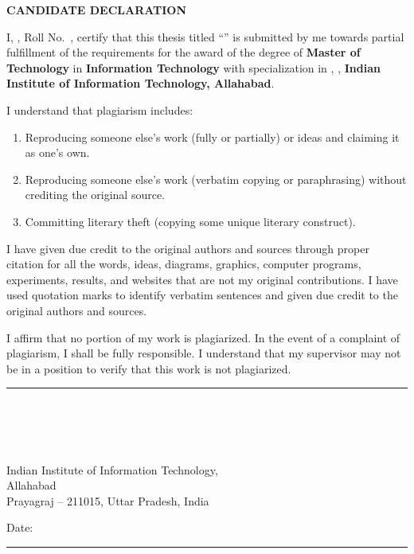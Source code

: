 \clearpage
\thispagestyle{empty}
\begin{singlespacing}
\noindent{}

\vspace{6mm}
\begin{center}
    {\large\bfseries CANDIDATE DECLARATION}
\end{center}
\vspace{4mm}

\noindent I, \textbf{\studentonename}, Roll No.\ \textbf{\studentoneroll}, certify that this thesis titled ``\textbf{\ttitle}'' is submitted by me towards partial fulfillment of the requirements for the award of the degree of \textbf{Master of Technology} in \textbf{Information Technology} with specialization in \textbf{\specializationname}, \textbf{\deptname}, \textbf{Indian Institute of Information Technology, Allahabad}.

\vspace{4mm}
\noindent I understand that plagiarism includes:
\begin{enumerate}
    \item Reproducing someone else's work (fully or partially) or ideas and claiming it as one's own.
    \item Reproducing someone else's work (verbatim copying or paraphrasing) without crediting the original source.
    \item Committing literary theft (copying some unique literary construct).
\end{enumerate}

\noindent I have given due credit to the original authors and sources through proper citation for all the words, ideas, diagrams, graphics, computer programs, experiments, results, and websites that are not my original contributions. I have used quotation marks to identify verbatim sentences and given due credit to the original authors and sources.

\vspace{4mm}
\noindent I affirm that no portion of my work is plagiarized. In the event of a complaint of plagiarism, I shall be fully responsible. I understand that my supervisor may not be in a position to verify that this work is not plagiarized.

\vspace{10mm}
\noindent\begin{minipage}[t]{0.50\textwidth}
    \rule{6cm}{0.4pt}\\[2mm]
    \textbf{\studentonename}\\
    \textbf{\studentoneroll}\\
    \deptname\\
    Indian Institute of Information Technology,\\
    Allahabad\\
    Prayagraj -- 211015, Uttar Pradesh, India
\end{minipage}
\hfill
\begin{minipage}[t]{0.35\textwidth}
    \vspace{2mm}
    Date: \rule{35mm}{0.4pt}
\end{minipage}
\end{singlespacing}

